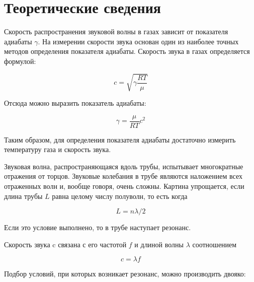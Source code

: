 \documentclass[a4paper,12pt]{article}
\begin{document}
\section{Теоретические сведения}

Скорость распространения звуковой волны в газах зависит от показателя адиабаты $\gamma$. На измерении скорости звука основан один из наиболее точных методов определения показателя адиабаты. Скорость звука в газах определяется формулой:

\begin{equation*}
    c = \sqrt{\gamma \frac{RT}{\mu}}
\end{equation*}

Отсюда можно выразить показатель адиабаты:

\begin{equation}\label{1}
    \gamma = \frac{\mu}{RT} c^2
\end{equation}

Таким образом, для определения показателя адиабаты достаточно измерить температуру газа и скорость звука.

Звуковая волна, распространяющаяся вдоль трубы, испытывает многократные отражения от торцов. Звуковые колебания в трубе являются наложением всех отраженных волн и, вообще говоря, очень сложны. Картина упрощается, если длина трубы $L$ равна целому числу полуволн, то есть когда

\begin{equation}\label{2}
    L = n \lambda / 2
\end{equation}

Если это условие выполнено, то в трубе наступает резонанс.

Скорость звука c связана с его частотой $f$ и длиной волны $\lambda$ соотношением

\begin{equation}\label{3}
    c = \lambda f
\end{equation}

Подбор условий, при которых возникает резонанс, можно производить двояко:
\end{document}
